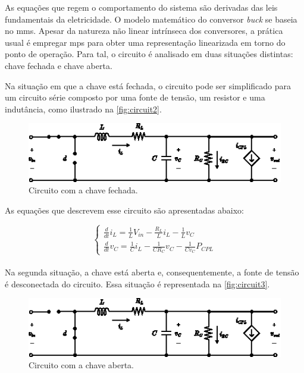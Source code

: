 As equações que regem o comportamento do sistema são derivadas das leis fundamentais da eletricidade. O modelo matemático do conversor \textit{buck} se baseia no \acrshort{mms}. Apesar da natureza não linear intrínseca dos conversores, a prática usual é empregar \acrshort{mps} para obter uma representação linearizada em torno do ponto de operação. Para tal, o circuito é analisado em duas situações distintas: chave fechada e chave aberta.

Na situação em que a chave está fechada, o circuito pode ser simplificado para um circuito série composto por uma fonte de tensão, um resistor e uma indutância, como ilustrado na \autoref{fig:circuit2}.

\begin{figure}[H]
  \centering
  \includegraphics[scale=2.5]{figuras/buck_conversor_with_cpl_circuit_m1.eps}
  \caption{Circuito com a chave fechada.}
  \label{fig:circuit2}
\end{figure}

\noindent As equações que descrevem esse circuito são apresentadas abaixo:

\begin{equation}
  \begin{cases}
    \frac{d}{dt}i_L =  \frac{1}{L} V_{in}  - \frac{R_L}{L} i_L - \frac{1}{L} v_C \\
    \frac{d}{dt} v_C = \frac{1}{C} i_L - \frac{1}{C R_C} v_C - \frac{1}{C v_C} P_{CPL}
    \label{eq:circuito-m1}
  \end{cases}
\end{equation}
\\
\indent Na segunda situação, a chave está aberta e, consequentemente, a fonte de tensão é desconectada do circuito. Essa situação é representada na \autoref{fig:circuit3}.

\begin{figure}[H]
  \centering
  \includegraphics[scale=2.5]{figuras/buck_conversor_with_cpl_circuit_m2.eps}
  \caption{Circuito com a chave aberta.}
  \label{fig:circuit3}
\end{figure}

